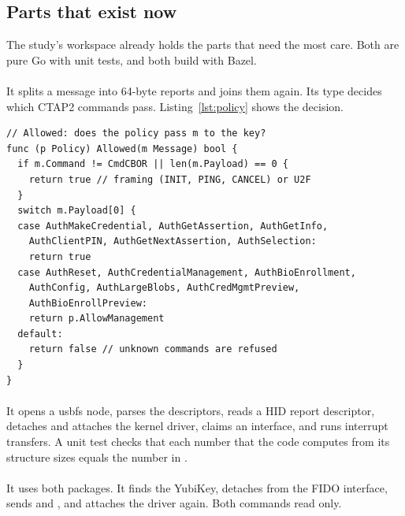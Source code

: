 \subsection{Parts that exist now}

The study's workspace already holds the parts that need the most care. Both
are pure Go with unit tests, and both build with Bazel.

\paragraph{} It splits a message into 64-byte reports and joins
them again. Its  type decides which CTAP2 commands pass.
Listing~\ref{lst:policy} shows the decision.

\begin{lstlisting}[style=go,caption={The command policy in package \code{ctaphid}},label={lst:policy},float=tb]
// Allowed: does the policy pass m to the key?
func (p Policy) Allowed(m Message) bool {
  if m.Command != CmdCBOR || len(m.Payload) == 0 {
    return true // framing (INIT, PING, CANCEL) or U2F
  }
  switch m.Payload[0] {
  case AuthMakeCredential, AuthGetAssertion, AuthGetInfo,
    AuthClientPIN, AuthGetNextAssertion, AuthSelection:
    return true
  case AuthReset, AuthCredentialManagement, AuthBioEnrollment,
    AuthConfig, AuthLargeBlobs, AuthCredMgmtPreview,
    AuthBioEnrollPreview:
    return p.AllowManagement
  default:
    return false // unknown commands are refused
  }
}
\end{lstlisting}

\paragraph{} It opens a usbfs node, parses the descriptors,
reads a HID report descriptor, detaches and attaches the kernel driver,
claims an interface, and runs interrupt transfers. A unit test checks that
each  number that the code computes from its structure sizes
equals the number in .

\paragraph{} It uses both packages. It finds the YubiKey,
detaches  from the FIDO interface, sends 
and , and attaches the driver again. Both commands read only.


